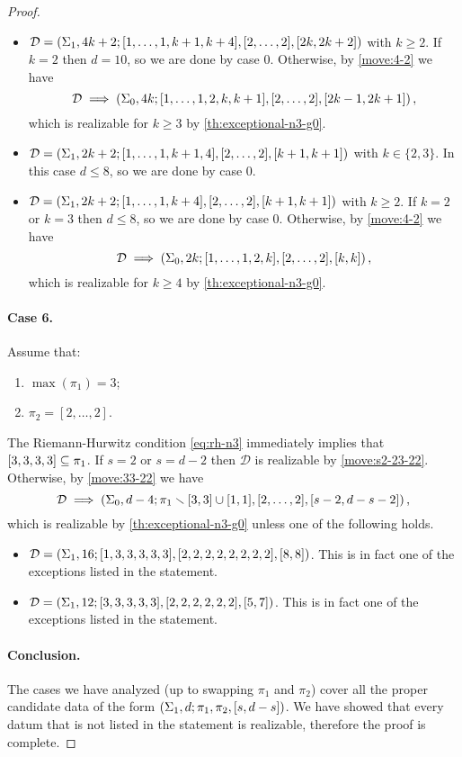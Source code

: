 \documentclass{article}
\begin{document}
\begin{proof}
\begin{itemize}
\item $\mathcal{D}=\left(\Sigma_1,4k+2;[1,\ldots,1,k+1,k+4],[2,\ldots,2],[2k,2k+2]\right)$ with $k\ge 2$. If $k=2$ then $d=10$, so we are done by case 0. Otherwise, by \cref{move:4-2} we have
\[
\mathcal{D}\implies\left(\Sigma_0,4k;[1,\ldots,1,2,k,k+1],[2,\ldots,2],[2k-1,2k+1]\right),
\]
which is realizable for $k\ge 3$ by \cref{th:exceptional-n3-g0}.
\item $\mathcal{D}=\left(\Sigma_1,2k+2;[1,\ldots,1,k+1,4],[2,\ldots,2],[k+1,k+1]\right)$ with $k\in\{2,3\}$. In this case $d\le 8$, so we are done by case 0.
\item $\mathcal{D}=\left(\Sigma_1,2k+2;[1,\ldots,1,k+4],[2,\ldots,2],[k+1,k+1]\right)$ with $k\ge 2$. If $k=2$ or $k=3$ then $d\le 8$, so we are done by case 0. Otherwise, by \cref{move:4-2} we have
\[
\mathcal{D}\implies\left(\Sigma_0,2k;[1,\ldots,1,2,k],[2,\ldots,2],[k,k]\right),
\]
which is realizable for $k\ge 4$ by \cref{th:exceptional-n3-g0}.
\end{itemize}

\paragraph{Case 6.} Assume that:
\begin{enumerate}
\item $\max(\pi_1)=3$;
\item $\pi_2=[2,\ldots,2]$.
\end{enumerate}
The Riemann-Hurwitz condition \eqref{eq:rh-n3} immediately implies that $[3,3,3,3]\subseteq\pi_1$. If $s=2$ or $s=d-2$ then $\mathcal{D}$ is realizable by \cref{move:s2-23-22}. Otherwise, by \cref{move:33-22} we have
\[
\mathcal{D}\implies\left(\Sigma_0,d-4;\pi_1\smallsetminus[3,3]\cup[1,1],[2,\ldots,2],[s-2,d-s-2]\right),
\]
which is realizable by \cref{th:exceptional-n3-g0} unless one of the following holds.
\begin{itemize}
\item $\mathcal{D}=\left(\Sigma_1,16;[1,3,3,3,3,3],[2,2,2,2,2,2,2,2],[8,8]\right)$. This is in fact one of the exceptions listed in the statement.
\item $\mathcal{D}=\left(\Sigma_1,12;[3,3,3,3,3],[2,2,2,2,2,2],[5,7]\right)$. This is in fact one of the exceptions listed in the statement.
\end{itemize}

\paragraph{Conclusion.} The cases we have analyzed (up to swapping $\pi_1$ and $\pi_2$) cover all the proper candidate data of the form $\left(\Sigma_1,d;\pi_1,\pi_2,[s,d-s]\right)$. We have showed that every datum that is not listed in the statement is realizable, therefore the proof is complete.
\end{proof}
\end{document}
